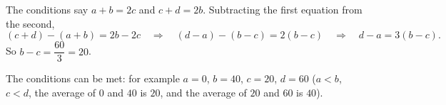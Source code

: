 The conditions say $a+b=2c$ and $c+d=2b$. Subtracting the first equation from the second,
\[(c+d)-(a+b)=2b-2c\quad\Longrightarrow\quad (d-a)-(b-c)=2(b-c)\quad\Longrightarrow\quad d-a=3(b-c).\]
So $b-c=\dfrac{60}{3}=\boxed{20}$.

The conditions can be met: for example $a=0$, $b=40$, $c=20$, $d=60$ ($a<b$, $c<d$, the average of $0$ and $40$ is $20$, and the average of $20$ and $60$ is $40$).
